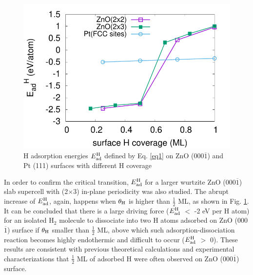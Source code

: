 \begingroup
\begin{figure}[!ht]
  \centering
  \includegraphics[width=0.9\linewidth]{Chap1/plots/Eadh_coverage_H.pdf}
\caption[H adsorption energies on ZnO surfaces with different H coverage]{H adsorption energies $E_{\textup{ad}}^{\textup{H}}$ defined by Eq. \ref{eq1} on ZnO (000$\overline{1}$) and Pt (111) surfaces with different H coverage}
  \label{Chap:ZnO_H:fig:Ead}
\end{figure}
\endgroup

In order to confirm the critical transition, $E_{\textup{ad}}^{\textup{H}}$ for a larger wurtzite ZnO (000$\overline{1}$) slab supercell with (2$\times$3) in-plane periodicity was also studied. The abrupt increase of $E_{\textup{ad}}^{\textup{H}}$, again, happens when $\theta_{\textup{H}}$ is higher than $\frac{1}{2}$ ML, as shown in Fig. \ref{Chap:ZnO_H:fig:Ead}. It can be concluded that there is a large driving force ($E_{\textup{ad}}^{\textup{H}}$ $<$ -2 eV per H atom) for an isolated H$_2$ molecule to dissociate into two H atoms adsorbed on ZnO (000$\overline{1}$) surface if $\theta_{\textup{H}}$ smaller than $\frac{1}{2}$ ML, above which such adsorption-dissociation reaction becomes highly endothermic and difficult to occur ($E_{\textup{ad}}^{\textup{H}}$ $>$ 0). These results are consistent with previous theoretical calculations and experimental characterizations that $\frac{1}{2}$ ML of adsorbed H were often observed on ZnO (000$\overline{1}$) surface\cite{lin2007density,meyer2004first,lauritsen2011stabilization}.
